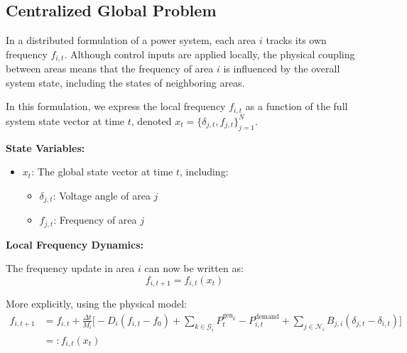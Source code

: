 \documentclass{article}
\begin{document}

\subsection{Centralized Global Problem}

In a distributed formulation of a power system, each area $i$ tracks its own frequency $f_{i,t}$. Although control inputs are applied locally, the physical coupling between areas means that the frequency of area $i$ is influenced by the overall system state, including the states of neighboring areas.

In this formulation, we express the local frequency $f_{i,t}$ as a function of the full system state vector at time $t$, denoted $x_t = \{ \delta_{j,t}, f_{j,t} \}_{j=1}^{N}$.

\textbf{State Variables:}
\begin{itemize}
    \item $x_t$: The global state vector at time $t$, including:
    \begin{itemize}
        \item $\delta_{j,t}$: Voltage angle of area $j$
        \item $f_{j,t}$: Frequency of area $j$
    \end{itemize}
\end{itemize}

\textbf{Local Frequency Dynamics:}

The frequency update in area $i$ can now be written as:
\begin{equation}
    f_{i,t+1} = f_{i,t}(x_t)
\end{equation}

More explicitly, using the physical model:
\begin{align}
    f_{i,t+1} &= f_{i,t} + \frac{\Delta t}{M_i} \Big[ -D_i(f_{i,t} - f_0) + \sum_{k \in \mathcal{G}_i} P^{\text{gen}_k}_t - P^{\text{demand}}_{i,t} + \sum_{j \in \mathcal{N}_i} B_{j,i}(\delta_{j,t} - \delta_{i,t}) \Big] \\
    &=: f_{i,t}(x_t)
\end{align}
\end{document}
